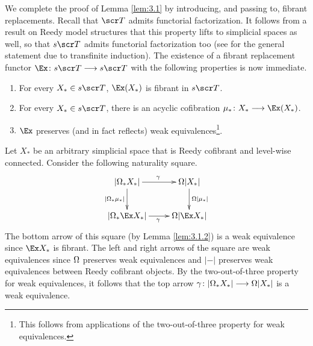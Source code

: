 \documentclass{amsart}
\theoremstyle{definition}
\begin{document}
\indent We complete the proof of Lemma \ref{lem:3.1} by introducing, and passing to, fibrant replacements. Recall that $\sT$ admits functorial factorization. It follows from a result on Reedy model structures that this property lifts to simplicial spaces as well, so that $s\sT$ admits functorial factorization too (see \cite[Theorem 5.2.5]{Hovey99} for the general statement due to transfinite induction). The existence of a fibrant replacement functor $\Ex \colon s\sT \rtarr s\sT$ with the following properties is now immediate.
\begin{enumerate}
\item For every $X_* \in s\sT$, $\Ex(X_*)$ is fibrant in $s\sT$.
\item For every $X_* \in s\sT$, there is an acyclic cofibration $\mu_* \colon X_* \rtarr \Ex(X_*)$.
\item $\Ex$ preserves (and in fact reflects) weak equivalences\footnote{This follows from applications of the two-out-of-three property for weak equivalences.}. 
\end{enumerate}

\noindent Let $X_*$ be an arbitrary simplicial space that is Reedy cofibrant and level-wise connected. Consider the following naturality square.
\[
\xymatrix{
|\OM_* X_*| \ar[r]^{\ga} \ar[d]_-{|\OM_* \mu_*|} & \OM |X_*| \ar[d]^-{\OM |\mu_*|}\\
|\OM_* \Ex X_*| \ar[r]_{\ga} & \OM |\Ex X_*|
}
\]
\noindent The bottom arrow of this square (by Lemma \ref{lem:3.1.2}) is a weak equivalence since $\Ex X_*$ is fibrant. The left and right arrows of the square are weak equivalences since $\Omega$ preserves weak equivalences and $|-|$ preserves weak equivalences between Reedy cofibrant objects. By the two-out-of-three property for weak equivalences, it follows that the top arrow $\gamma \colon |\Omega_* X_*| \longrightarrow \Omega |X_*|$ is a weak equivalence.

\printbibliography
\end{document}
